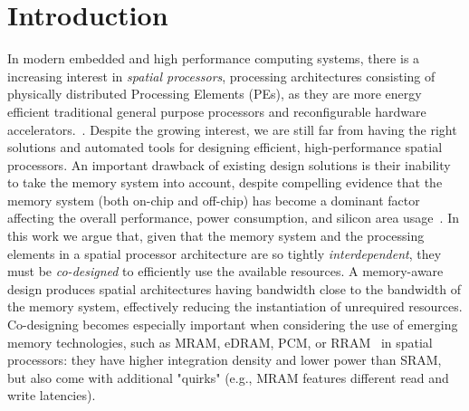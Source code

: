 \section{Introduction}
In modern embedded and high performance computing systems, there is a increasing interest in \textit{spatial processors}, processing architectures consisting of physically distributed Processing Elements (PEs), as they are more energy efficient traditional general purpose processors and reconfigurable hardware accelerators.~\cite{parashar2014efficient,prabhakar2017plasticine,budiu2004spatial,streamproc2019,cerqueira2020catena,7284058,8686088}. %
Despite the growing interest, we are still far from having the right  solutions and automated tools for designing efficient, high-performance spatial processors. An important drawback of existing design solutions is their inability to take the memory system into account, despite compelling evidence that the memory system (both on-chip and off-chip) has become a dominant factor affecting the overall performance, power consumption, and silicon area usage~\cite{williams2009roofline,dayarathna2015data,oh2009analytical}.
In this work we argue that, given that the memory system and the processing elements in a spatial processor architecture are so tightly \textit{interdependent}, they must be \textit{co-designed} to efficiently use the available resources. A memory-aware design produces spatial architectures having bandwidth close to the bandwidth of the memory system, effectively reducing the instantiation of unrequired resources. Co-designing becomes especially important when considering the use of emerging memory technologies, such as MRAM, eDRAM, PCM, or RRAM~\cite{mem2016} in spatial processors: they have higher integration density and lower power than SRAM, but also come with additional "quirks" (e.g., MRAM features different read and write latencies).

%

